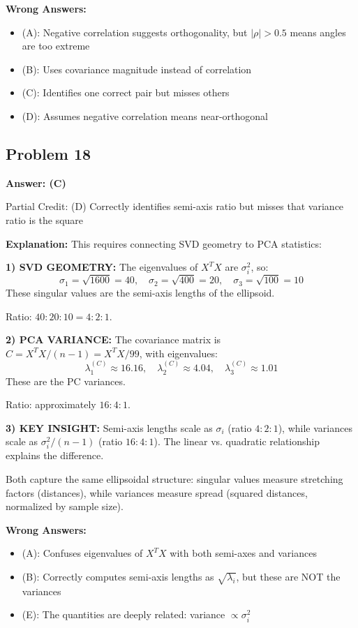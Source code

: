\documentclass[12pt]{amsart}
\newcommand{\correct}[1]{{\color{correctgreen}\textbf{#1}}}
\newcommand{\partcred}[1]{{\color{partialblue}#1}}
\begin{document}
\begin{itemize}
\textbf{Wrong Answers:}
\begin{itemize}
\item (A): Negative correlation suggests orthogonality, but $|\rho| > 0.5$ means angles are too extreme
\item (B): Uses covariance magnitude instead of correlation
\item (C): Identifies one correct pair but misses others
\item (D): Assumes negative correlation means near-orthogonal
\end{itemize}

\subsection*{Problem 18}
\correct{Answer: (C)}

\partcred{Partial Credit: (D) Correctly identifies semi-axis ratio but misses that variance ratio is the square}

\textbf{Explanation:} This requires connecting SVD geometry to PCA statistics:

\textbf{1) SVD GEOMETRY:} The eigenvalues of $X^TX$ are $\sigma_i^2$, so:
$$\sigma_1 = \sqrt{1600} = 40, \quad \sigma_2 = \sqrt{400} = 20, \quad \sigma_3 = \sqrt{100} = 10$$
These singular values are the semi-axis lengths of the ellipsoid.

Ratio: $40 : 20 : 10 = 4 : 2 : 1$.

\textbf{2) PCA VARIANCE:} The covariance matrix is $C = X^TX/(n-1) = X^TX/99$, with eigenvalues:
$$\lambda_1^{(C)} \approx 16.16, \quad \lambda_2^{(C)} \approx 4.04, \quad \lambda_3^{(C)} \approx 1.01$$
These are the PC variances.

Ratio: approximately $16 : 4 : 1$.

\textbf{3) KEY INSIGHT:} Semi-axis lengths scale as $\sigma_i$ (ratio $4:2:1$), while variances scale as $\sigma_i^2/(n-1)$ (ratio $16:4:1$). The linear vs. quadratic relationship explains the difference.

Both capture the same ellipsoidal structure: singular values measure stretching factors (distances), while variances measure spread (squared distances, normalized by sample size).

\textbf{Wrong Answers:}
\begin{itemize}
\item (A): Confuses eigenvalues of $X^TX$ with both semi-axes and variances
\item (B): Correctly computes semi-axis lengths as $\sqrt{\lambda_i}$, but these are NOT the variances
\item (E): The quantities are deeply related: variance $\propto \sigma_i^2$
\end{itemize}


\end{itemize}
\end{document}
